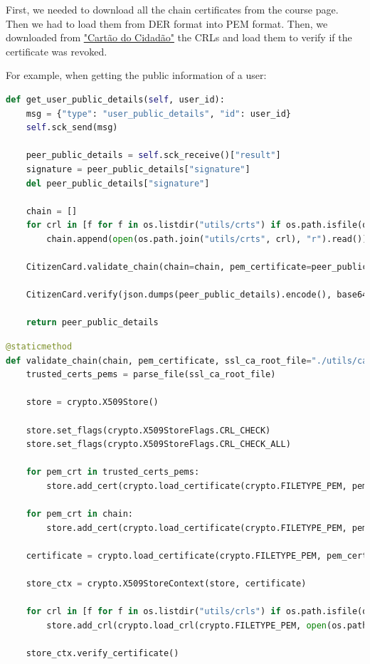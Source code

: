 \documentclass[pdftex,12pt,a4paper]{report}
\begin{document}
First, we needed to download all the chain certificates from the course page. Then we had to load them from DER format into PEM format.
Then, we downloaded from \href{http:/pki.cartaodecidadao.pt}{"Cartão do Cidadão"} the CRLs and load them to verify if the certificate was revoked.

For example, when getting the public information of a user:
\begin{lstlisting}[language=Python]
def get_user_public_details(self, user_id):
    msg = {"type": "user_public_details", "id": user_id}
    self.sck_send(msg)

    peer_public_details = self.sck_receive()["result"]
    signature = peer_public_details["signature"]
    del peer_public_details["signature"]

    chain = []
    for crl in [f for f in os.listdir("utils/crts") if os.path.isfile(os.path.join("utils/crts", f))]:
        chain.append(open(os.path.join("utils/crts", crl), "r").read())

    CitizenCard.validate_chain(chain=chain, pem_certificate=peer_public_details["cc_public_certificate"].encode())

    CitizenCard.verify(json.dumps(peer_public_details).encode(), base64.b64decode(signature.encode()), peer_public_details["cc_public_certificate"].encode())

    return peer_public_details
\end{lstlisting}


\begin{lstlisting}[language=Python]
@staticmethod
def validate_chain(chain, pem_certificate, ssl_ca_root_file="./utils/ca-bundle.txt"):
    trusted_certs_pems = parse_file(ssl_ca_root_file)

    store = crypto.X509Store()

    store.set_flags(crypto.X509StoreFlags.CRL_CHECK)
    store.set_flags(crypto.X509StoreFlags.CRL_CHECK_ALL)

    for pem_crt in trusted_certs_pems:
        store.add_cert(crypto.load_certificate(crypto.FILETYPE_PEM, pem_crt.as_bytes()))

    for pem_crt in chain:
        store.add_cert(crypto.load_certificate(crypto.FILETYPE_PEM, pem_crt))

    certificate = crypto.load_certificate(crypto.FILETYPE_PEM, pem_certificate)

    store_ctx = crypto.X509StoreContext(store, certificate)

    for crl in [f for f in os.listdir("utils/crls") if os.path.isfile(os.path.join("utils/crls", f))]:
        store.add_crl(crypto.load_crl(crypto.FILETYPE_PEM, open(os.path.join("utils/crls", crl), "r").read()))

    store_ctx.verify_certificate()
\end{lstlisting}
\end{document}
